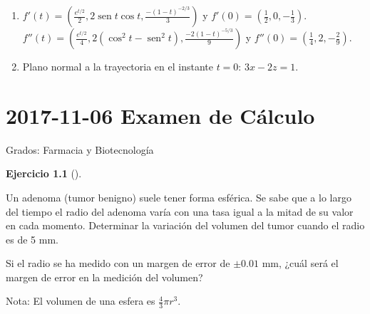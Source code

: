 \documentclass[
  a4paper,
]{scrreport}
\providecommand{\tightlist}{%
  \setlength{\itemsep}{0pt}\setlength{\parskip}{0pt}}\usepackage{longtable,booktabs,array}
\theoremstyle{definition}
\newtheorem{exercise}{Ejercicio}[chapter]
\theoremstyle{remark}
\begin{document}
\begin{tcolorbox}[enhanced jigsaw, opacitybacktitle=0.6, titlerule=0mm, bottomtitle=1mm, toptitle=1mm, breakable, bottomrule=.15mm, left=2mm, opacityback=0, toprule=.15mm, leftrule=.75mm, colframe=quarto-callout-tip-color-frame, coltitle=black, rightrule=.15mm, colback=white, title=\textcolor{quarto-callout-tip-color}{\faLightbulb}\hspace{0.5em}{Solución}, arc=.35mm, colbacktitle=quarto-callout-tip-color!10!white]

\begin{enumerate}
\def\labelenumi{\arabic{enumi}.}
\tightlist
\item
  \(f'(t)=\left(\frac{e^{t/2}}{2},2\operatorname{sen} t \cos t, \frac{-(1-t)^{-2/3}}{3}\right)\)
  y \(f'(0)=\left(\frac{1}{2},0,-\frac{1}{3}\right)\).\\
  \(f''(t)=\left(\frac{e^{t/2}}{4},2(\cos^2 t-\operatorname{sen}^2 t), \frac{-2(1-t)^{-5/3}}{9}\right)\)
  y \(f''(0)=\left(\frac{1}{4},2,-\frac{2}{9}\right)\).
\item
  Plano normal a la trayectoria en el instante \(t=0\): \(3x-2z=1\).
\end{enumerate}

\end{tcolorbox}


\chapter{\texorpdfstring{2017-11-06 Examen de
Cálculo}{2017-11-06  Examen de Cálculo}}\label{examen-de-cuxe1lculo-2}

Grados: Farmacia y Biotecnología

\begin{exercise}[]\protect\hypertarget{exr-1}{}\label{exr-1}

Un adenoma (tumor benigno) suele tener forma esférica. Se sabe que a lo
largo del tiempo el radio del adenoma varía con una tasa igual a la
mitad de su valor en cada momento. Determinar la variación del volumen
del tumor cuando el radio es de 5 mm.

Si el radio se ha medido con un margen de error de \(\pm 0.01\) mm,
¿cuál será el margen de error en la medición del volumen?

Nota: El volumen de una esfera es \(\frac{4}{3}\pi r^3\).

\end{exercise}
\end{document}
